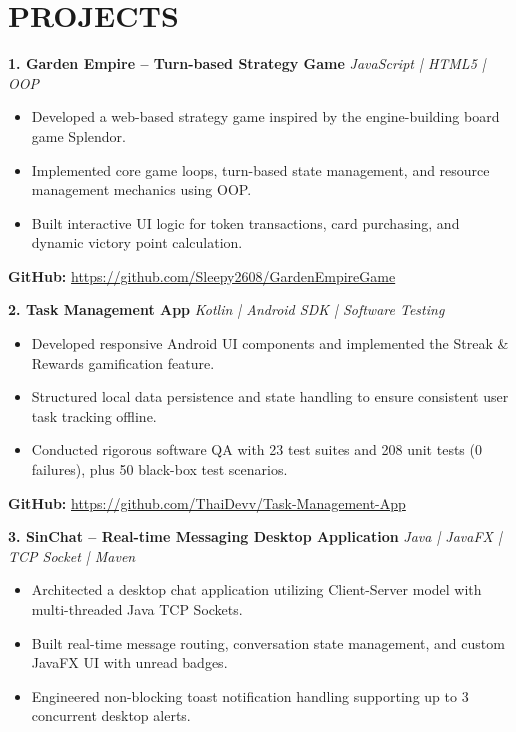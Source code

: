 \documentclass[10pt,a4paper]{extarticle}
\newcommand{\project}[2]{
    \vspace{2pt}
    \textbf{#1}
    \hfill
    {\small\textit{#2}}
}
\begin{document}

\section{PROJECTS}

\project{1. Garden Empire -- Turn-based Strategy Game}
{JavaScript | HTML5 | OOP}

\begin{itemize}
    \item Developed a web-based strategy game inspired by the engine-building board game Splendor.
    \item Implemented core game loops, turn-based state management, and resource management mechanics using OOP.
    \item Built interactive UI logic for token transactions, card purchasing, and dynamic victory point calculation.
\end{itemize}

\textbf{GitHub:}
\href{https://github.com/Sleepy2608/GardenEmpireGame}
{https://github.com/Sleepy2608/GardenEmpireGame}

\vspace{3pt}

\project{2. Task Management App}
{Kotlin | Android SDK | Software Testing}

\begin{itemize}
    \item Developed responsive Android UI components and implemented the Streak \& Rewards gamification feature.
    \item Structured local data persistence and state handling to ensure consistent user task tracking offline.
    \item Conducted rigorous software QA with 23 test suites and 208 unit tests (0 failures), plus 50 black-box test scenarios.
\end{itemize}

\textbf{GitHub:} 
\href{https://github.com/ThaiDevv/Task-Management-App}
{https://github.com/ThaiDevv/Task-Management-App}

\vspace{3pt}

\project{3. SinChat -- Real-time Messaging Desktop Application}
{Java | JavaFX | TCP Socket | Maven}

\begin{itemize}
    \item Architected a desktop chat application utilizing Client-Server model with multi-threaded Java TCP Sockets.
    \item Built real-time message routing, conversation state management, and custom JavaFX UI with unread badges.
    \item Engineered non-blocking toast notification handling supporting up to 3 concurrent desktop alerts.
\end{itemize}
\end{document}
